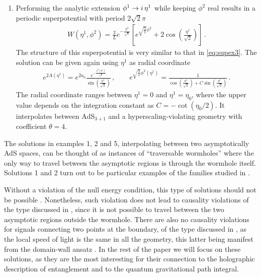 \begin{enumerate}
\item Performing the analytic extension $\phi^1\to i\,\eta^1$ while keeping $\phi^2$ real results in a periodic superpotential with period $2\sqrt{2}\pi$
\begin{align}
W(\eta^1,\phi^2)=\frac{2}{L}e^{-\frac{\phi^2}{\sqrt{6}}}\left[e^{\sqrt{\frac{3}{2}}\phi^2}+2\cos\left(\frac{\eta^1}{\sqrt{2}}\right)\right]\,.
\end{align}
The structure of this superpotential is very similar to that in \cref{eq:supex3}.
The solution can be given again using $\eta^1$ as radial coordinate
\begin{align}
	e^{2A(\eta^1)}=e^{2a_0}\frac{e^{-\frac{\phi^2(\eta^1)}{\sqrt{6}}}}{\sin\left(\frac{\eta^1}{\sqrt{2}}\right)}
	\,,\qquad e^{\sqrt{\frac32}\phi^2(\eta^1)}=\frac{1}{\cos\left(\frac{\eta^1}{\sqrt{2}}\right)+C\sin\left(\frac{\eta^1}{\sqrt{2}}\right)}\,.
\end{align}
The radial coordinate ranges between $\eta^1=0$ and $\eta^1=\eta_0$, where the upper value depends on the integration constant as $C=-\cot\left(\eta_0/2\right)$.
It interpolates between $\text{AdS}_{3+1}$ and a hyperscaling-violating geometry with coefficient $\theta=4$.

\end{enumerate}

The solutions in examples 1, 2 and 5, interpolating between two asymptotically AdS spaces, can be thought of as instances of ``traversable wormholes'' where the only way to travel between the asymptotic regions is through the wormhole itself.
Solutions 1 and 2 turn out to be particular examples of the families studied in \cite{Huang:2020qmn,Nozawa:2020gzz}.

Without a violation of the null energy condition, this type of solutions should not be possible \cite{Morris:1988tu,Hochberg:1998ii}.
Nonetheless, such violation does not lead to causality violations of the type discussed in \cite{Morris:1988tu}, since it is not possible to travel between the two asymptotic regions outside the wormhole.
There are also no causality violations for signals connecting two points at the boundary, of the type discussed in \cite{Hoyos:2010at}, as the local speed of light is the same in all the geometry, this latter being manifest from the domain-wall ansatz .
In the rest of the paper we will focus on these solutions, as they are the most interesting for their connection to the holographic description of entanglement and to the quantum gravitational path integral.

